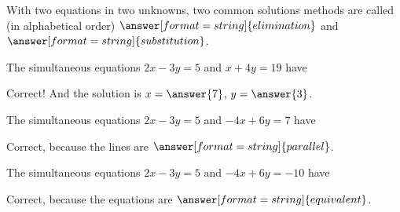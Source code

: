 \documentclass[nooutcomes]{ximera}
\begin{document}
\begin{problem}
With two equations in two unknowns, two common solutions methods are called (in alphabetical order)   $\answer[format=string]{elimination}$ and $\answer[format=string]{substitution}$. 
\end{problem}

\begin{problem}
The simultaneous equations  $2x-3y=5$ and $x+4y=19$ have
\begin{multipleChoice}
\end{multipleChoice}
\begin{problem}
Correct!  And the solution is $x=\answer{7}$, $y = \answer{3}$. 
\end{problem}
\end{problem}

\begin{problem}
The simultaneous equations  $2x-3y=5$ and $-4x+6y=7$ have
\begin{multipleChoice}
\end{multipleChoice}
\begin{problem}
Correct, because the lines are $\answer[format=string]{parallel}$.
\end{problem}
\end{problem}

\begin{problem}
The simultaneous equations  $2x-3y=5$ and $-4x+6y=-10$ have
\begin{multipleChoice}
\end{multipleChoice}
\begin{problem}
Correct, because the equations are $\answer[format=string]{equivalent}$.
\end{problem}
\end{problem}

  
\end{document}
